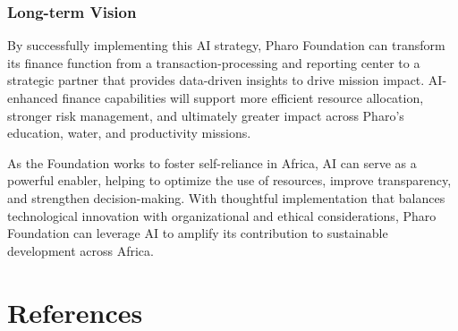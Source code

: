 \documentclass[
]{article}
\begin{document}
\subsubsection{Long-term Vision}\label{long-term-vision}

By successfully implementing this AI strategy, Pharo Foundation can
transform its finance function from a transaction-processing and
reporting center to a strategic partner that provides data-driven
insights to drive mission impact. AI-enhanced finance capabilities will
support more efficient resource allocation, stronger risk management,
and ultimately greater impact across Pharo's education, water, and
productivity missions.

As the Foundation works to foster self-reliance in Africa, AI can serve
as a powerful enabler, helping to optimize the use of resources, improve
transparency, and strengthen decision-making. With thoughtful
implementation that balances technological innovation with
organizational and ethical considerations, Pharo Foundation can leverage
AI to amplify its contribution to sustainable development across Africa.

\section*{References}\label{references}
\end{document}
